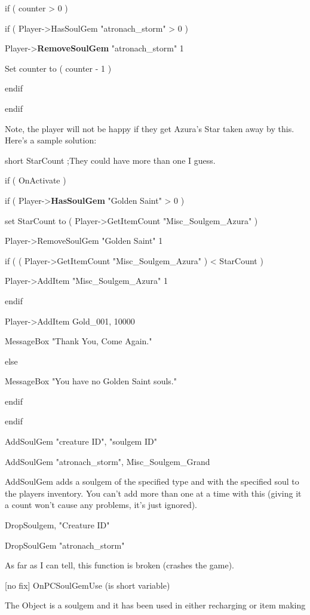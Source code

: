 \documentclass[
]{article}
\begin{document}
if ( counter \textgreater{} 0 )

if ( Player-\textgreater HasSoulGem "atronach\_storm" \textgreater{} 0 )

Player-\textgreater{}\textbf{RemoveSoulGem} "atronach\_storm" 1

Set counter to ( counter - 1 )

endif

endif

Note, the player will not be happy if they get Azura's Star taken away
by this. Here's a sample solution:

short StarCount ;They could have more than one I guess.

if ( OnActivate )

if ( Player-\textgreater{}\textbf{HasSoulGem} "Golden Saint"
\textgreater{} 0 )

set StarCount to ( Player-\textgreater GetItemCount
"Misc\_Soulgem\_Azura" )

Player-\textgreater RemoveSoulGem "Golden Saint" 1

if ( ( Player-\textgreater GetItemCount "Misc\_Soulgem\_Azura" )
\textless{} StarCount )

Player-\textgreater AddItem "Misc\_Soulgem\_Azura" 1

endif

Player-\textgreater AddItem Gold\_001, 10000

MessageBox "Thank You, Come Again."

else

MessageBox "You have no Golden Saint souls."

endif

endif

AddSoulGem "creature ID", "soulgem ID"

AddSoulGem "atronach\_storm", Misc\_Soulgem\_Grand

AddSoulGem adds a soulgem of the specified type and with the specified
soul to the players inventory. You can't add more than one at a time
with this (giving it a count won't cause any problems, it's just
ignored).

DropSoulgem, "Creature ID"

DropSoulGem "atronach\_storm"

As far as I can tell, this function is broken (crashes the game).

{[}no fix{]} OnPCSoulGemUse (is short variable)

The Object is a soulgem and it has been used in either recharging or
item making
\end{document}
